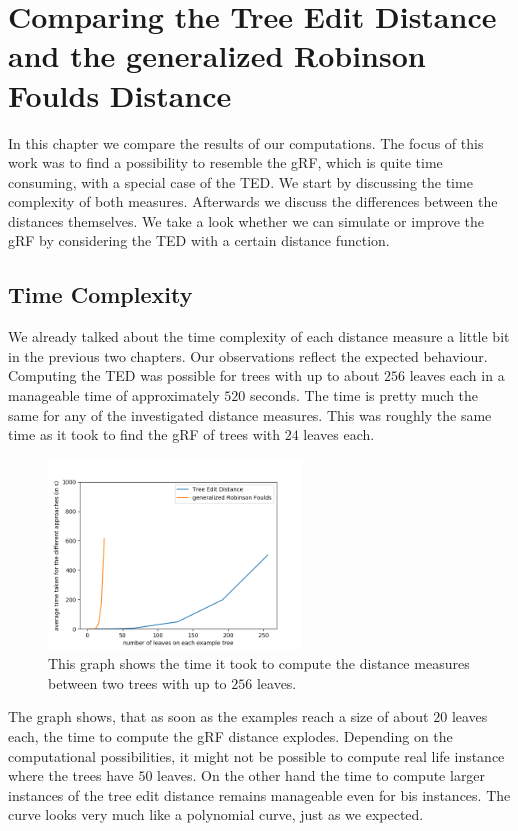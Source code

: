 \chapter{Comparing the Tree Edit Distance and the generalized Robinson Foulds Distance}
In this chapter we compare the results of our computations. The focus of this work was to find a possibility to resemble the gRF, which is quite time consuming, with a special case of the TED. We start by discussing the time complexity of both measures. Afterwards we discuss the differences between the distances themselves. We take a look whether we can simulate or improve the gRF by considering the TED with a certain distance function.

\section{Time Complexity}
We already talked about the time complexity of each distance measure a little bit in the previous two chapters. Our observations reflect the expected behaviour. Computing the TED was possible for trees with up to about $256$ leaves each in a manageable time of approximately $520$ seconds. The time is pretty much the same for any of the investigated distance measures. This was roughly the same time as it took to find the gRF of trees with $24$ leaves each.
\begin{figure}[!ht]
	\centering
	\includegraphics[width=0.6\textwidth]{figures/time_plot_all.png}
	\caption{This graph shows the time it took to compute the distance measures between two trees with up to $256$ leaves.}
	\label{fig:time}
\end{figure} 
The graph shows, that as soon as the examples reach a size of about $20$ leaves each, the time to compute the gRF distance explodes. Depending on the computational possibilities, it might not be possible to compute real life instance where the trees have $50$ leaves. On the other hand the time to compute larger instances of the tree edit distance remains manageable even for bis instances. The curve looks very much like a polynomial curve, just as we expected.

